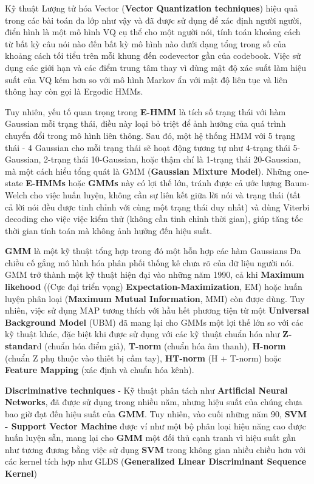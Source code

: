 \documentclass{article}
\begin{document}
	Kỹ thuật Lượng tử hóa Vector (\textbf{Vector Quantization techniques}) hiệu quả trong các bài toán đa lớp như vậy và đã được sử dụng để xác định người người, điển hình là một mô hình VQ cụ thể cho một người nói, tính toán khoảng cách từ bất kỳ câu nói nào đến bất kỳ mô hình nào dưới dạng tổng trong số của khoảng cách tối tiểu trên mỗi khung đến codevector gần của codebook. Việc sử dụng các giới hạn và các điểm trung tâm thay vì dùng mật độ xác suất làm hiệu suất của VQ kém hơn so với mô hình Markov ẩn với mật độ liên tục và liên thông hay còn gọi là Ergodic HMMs. 
	
	Tuy nhiên, yếu tố quan trọng trong \textbf{E-HMM} là tích số trạng thái với hàm Gaussian mỗi trạng thái, điều này loại bỏ triệt để ảnh hưởng của quá trình chuyển đổi trong mô hình liên thông. Sau đó, một hệ thống HMM với 5 trạng thái - 4 Gaussian cho mỗi trạng thái sẽ hoạt động tương tự như 4-trạng thái 5-Gaussian, 2-trạng thái 10-Gaussian, hoặc thậm chí là 1-trạng thái 20-Gaussian,  mà một cách hiểu tổng quát là GMM (\textbf{Gaussian Mixture Model}). Những one-state \textbf{E-HMMs} hoặc \textbf{GMMs} này có lợi thế lớn, tránh được cả ước lượng Baum-Welch cho việc huấn luyện, không cần sự liên kết giữa lời nói và trạng thái (tất cả lời nói đều được tinh chỉnh với cùng một trạng thái duy nhất) và dùng Viterbi decoding cho việc việc kiểm thử (không cần tinh chỉnh thời gian), giúp tăng tốc thời gian tính toán mà không ảnh hưởng đến hiệu suất.
	
	\textbf{GMM} là một kỹ thuật tổng hợp trong đó một hỗn hợp các hàm Gaussians Đa chiều cố gắng mô hình hóa phân phối thống kê chưa rõ của dữ liệu người nói. GMM trở thành một kỹ thuật hiện đại vào những năm 1990, cả khi \textbf{Maximum likehood} ((Cực đại triển vọng) \textbf{Expectation-Maximization}, EM) hoặc huấn luyện phân loại (\textbf{Maximum Mutual Information}, MMI) còn được dùng. Tuy nhiên, việc sử dụng MAP tương thích với hầu hết phương tiện từ một \textbf{Universal Background Model} (UBM) đã mang lại cho GMMs một lợi thế lớn so với các kỹ thuật khác, đặc biệt khi được sử dụng với các kỹ thuật chuẩn hóa như \textbf{Z-standar}d (chuẩn hóa điểm giả), \textbf{T-norm} (chuẩn hóa âm thanh), \textbf{H-norm} (chuẩn Z phụ thuộc vào thiết bị cầm tay), \textbf{HT-norm} (H + T-norm) hoặc \textbf{Feature Mapping} (xác định và chuẩn hóa kênh).
	
	\textbf{Discriminative techniques} - Kỹ thuật phân tách như \textbf{Artificial Neural Networks}, đã được sử dụng trong nhiều năm, nhưng hiệu suất của chúng chưa bao giờ đạt đến hiệu suất của \textbf{GMM}. Tuy nhiên, vào cuối những năm 90, \textbf{SVM - Support Vector Machine} được ví như một bộ phân loại hiệu năng cao được huấn luyện sẵn, mang lại cho \textbf{GMM} một đối thủ cạnh tranh vì hiệu suất gần như tương đương bằng việc sử dụng \textbf{SVM} trong không gian nhiều chiều hơn với các kernel tích hợp như GLDS (\textbf{Generalized Linear Discriminant Sequence Kernel})
	
\end{document}
